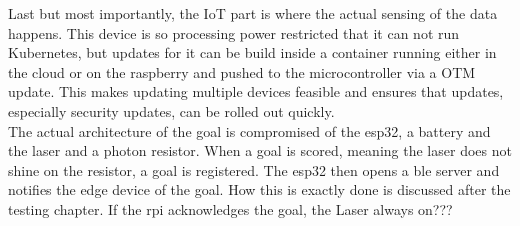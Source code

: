 Last but most importantly, the IoT part is where the actual sensing of the data happens. This device is so processing power restricted that it can not run Kubernetes, but updates for it can be build inside a container running either in the cloud or on the raspberry and pushed to the microcontroller via a OTM update. This makes updating multiple devices feasible and ensures that updates, especially security updates, can be rolled out quickly.\\
The actual architecture of the goal is compromised of the esp32, a battery and the laser and a photon resistor. When a goal is scored, meaning the laser does not shine on the resistor, a goal is registered. The esp32 then opens a ble server and notifies the edge device of the goal. How this is exactly done is discussed after the testing chapter. If the rpi acknowledges the goal, the 
Laser always on???


